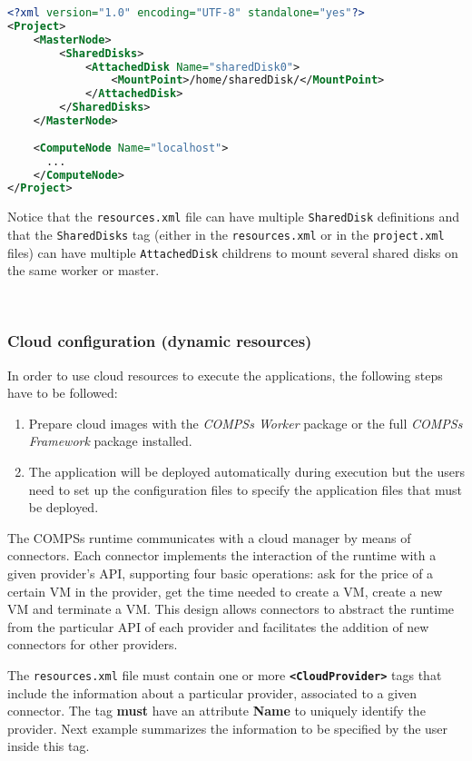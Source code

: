 \newpage

\begin{lstlisting}[language=xml]
<?xml version="1.0" encoding="UTF-8" standalone="yes"?>
<Project>
    <MasterNode>
        <SharedDisks>
            <AttachedDisk Name="sharedDisk0">
                <MountPoint>/home/sharedDisk/</MountPoint>
            </AttachedDisk>
        </SharedDisks>
    </MasterNode>
    
    <ComputeNode Name="localhost">
      ...
    </ComputeNode>
</Project>
\end{lstlisting}

Notice that the \texttt{resources.xml} file can have multiple \texttt{SharedDisk} definitions and that the \texttt{SharedDisks}
tag (either in the \texttt{resources.xml} or in the \texttt{project.xml} files) can have multiple \texttt{AttachedDisk} childrens
to mount several shared disks on the same worker or master. 

~ \newline

\subsubsection{Cloud configuration (dynamic resources)}
In order to use cloud resources to execute the applications, the following steps have to be followed:
\begin{enumerate}
 \item Prepare cloud images with the \textit{COMPSs Worker} package or the full \textit{COMPSs Framework} package installed.
 \item The application will be deployed automatically during execution but the users need to set up the configuration files to
 specify the application files that must be deployed. 
\end{enumerate}

The COMPSs runtime communicates with a cloud manager by means of connectors. Each connector implements 
the interaction of the runtime with a given provider's API, supporting four basic 
operations: ask for the price of a certain VM in the provider, get the time needed to create a VM, 
create a new VM and terminate a VM. This design allows connectors to abstract the runtime from the particular API
of each provider and facilitates the addition of new connectors for other providers.

The \texttt{resources.xml} file must contain one or more \textbf{\texttt{<CloudProvider>}} tags
that include the information about a particular provider, associated to a given connector. The tag \textbf{must} have an
attribute \textbf{Name} to uniquely identify the provider. Next example summarizes the information to be specified by the 
user inside this tag.

